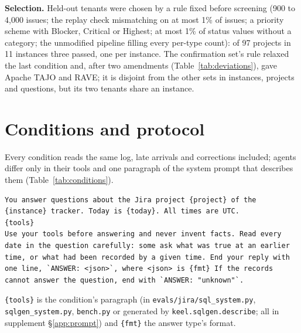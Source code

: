 \documentclass[sigconf, nonacm]{acmart}
\newcommand{\code}[1]{\texttt{#1}}
\begin{document}
\textbf{Selection.} Held-out tenants were chosen by a rule fixed before screening (900 to 4,000 issues; the replay check mismatching on at most 1\% of issues; a priority scheme with Blocker, Critical or Highest; at most 1\% of status values without a category; the unmodified pipeline filling every per-type count): of 97 projects in 11 instances three passed, one per instance. The confirmation set's rule relaxed the last condition and, after two amendments (Table~\ref{tab:deviations}), gave Apache TAJO and RAVE; it is disjoint from the other sets in instances, projects and questions, but its two tenants share an instance.

\section{Conditions and protocol}
\label{sec:conditions}
\label{sec:systems}

Every condition reads the same log, late arrivals and corrections included; agents differ only in their tools and one paragraph of the system prompt that describes them (Table~\ref{tab:conditions}).

\begin{lstlisting}
You answer questions about the Jira project {project} of the {instance} tracker. Today is {today}. All times are UTC.
{tools}
Use your tools before answering and never invent facts. Read every date in the question carefully: some ask what was true at an earlier time, or what had been recorded by a given time. End your reply with one line, `ANSWER: <json>`, where <json> is {fmt} If the records cannot answer the question, end with `ANSWER: "unknown"`.
\end{lstlisting}
\code{\{tools\}} is the condition's paragraph (in \code{evals/jira/sql\_system.py}, \code{sqlgen\_system.py}, \code{bench.py} or generated by \code{keel.sqlgen.describe}; all in supplement \S\ref{app:prompt}) and \code{\{fmt\}} the answer type's format.
\end{document}

